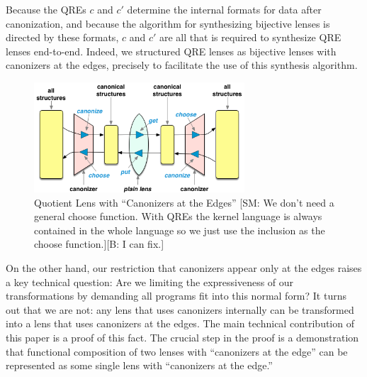 \documentclass[acmsmall,review,anonymous]{acmart}
\newcommand{\FINISH}[3]{\ifdraft\textcolor{#1}{[#2: #3]}\fi}
\newcommand{\bcp}[1]{\FINISH{dkred}{B}{#1}}
\newcommand{\sam}[1]{\FINISH{dkpurple}{SM}{#1}}
\newcommand{\bibtex}{\textsc{Bib}\TeX{}}
\newcommand{\cd}[1]{\lstinline[backgroundcolor=\color{white}]$#1$}
\begin{document}
Because the QREs $c$ and $c'$ determine the internal formats for data after
canonization, and because the algorithm for synthesizing bijective lenses is
directed by these formats, $c$ and $c'$ are all that is required to synthesize
QRE lenses end-to-end.  Indeed, we structured QRE lenses as bijective lenses with
canonizers at the edges, precisely to facilitate the use of this synthesis algorithm.

\begin{figure}[t]
\centering
\includegraphics[width=0.7\textwidth]{canonizers-outside}
\caption{Quotient Lens with ``Canonizers at the Edges''
\sam{We don't need a general choose function. With QREs the kernel language is
always contained in the whole language so we just use the inclusion as the
choose function.}\bcp{I can fix.}}
\label{fig:attheedges}
\end{figure}


On the other hand, our restriction that canonizers appear only at the edges
raises a key technical question:  Are we limiting the expressiveness of our transformations
by demanding all programs fit into this normal form?  It turns out that we are not:
any lens that uses canonizers internally can be transformed into a lens that uses canonizers
at the edges.  The main technical contribution of this paper is a proof of this fact.  The
crucial step in the proof is a demonstration that functional composition of two lenses
with ``canonizers at the edge'' can be represented as some single lens with ``canonizers at the
edge.''

\end{document}
